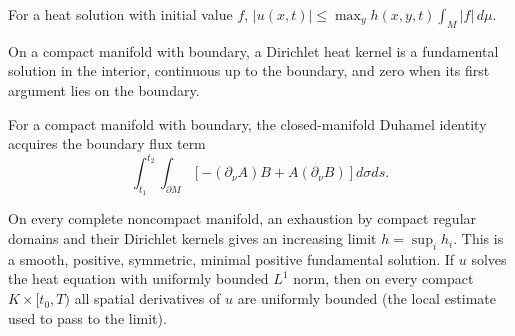 \begin{corollary}
\label{cor:chow-ii-heat-kernel-sup-bound}


For a heat solution with initial value $f$,
$|u(x,t)|\le\max_yh(x,y,t)\int_M|f|\,d\mu$.
\end{corollary}

\begin{definition}
\label{def:chow-ii-dirichlet-heat-kernel}

On a compact manifold with boundary, a Dirichlet heat kernel is a fundamental
solution in the interior, continuous up to the boundary, and zero when its
first argument lies on the boundary.
\end{definition}

\begin{lemma}
\label{lem:chow-ii-duhamel-boundary}

For a compact manifold with boundary, the closed-manifold Duhamel identity
acquires the boundary flux term
\[
\int_{t_1}^{t_2}\!\int_{\partial M}\left[-(\partial_\nu A)B+A(\partial_\nu B)\right]d\sigma ds.
\]
\end{lemma}

\begin{theorem}
\label{thm:chow-ii-minimal-positive-heat-kernel}


On every complete noncompact manifold, an exhaustion by compact regular
domains and their Dirichlet kernels gives an increasing limit $h=\sup_i h_i$.
This is a smooth, positive, symmetric, minimal positive fundamental solution.
If $u$ solves the heat equation with uniformly bounded $L^1$ norm, then on
every compact $K\times[t_0,T)$ all spatial derivatives of $u$ are uniformly
bounded (the local estimate used to pass to the limit).
\end{theorem}


